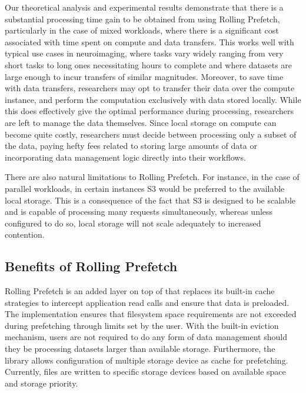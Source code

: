Our theoretical analysis and experimental results demonstrate that there is a substantial processing time gain to be
obtained from using Rolling Prefetch, particularly in the case of mixed workloads, where there is a significant
cost associated with time spent on compute and data transfers. This works well with typical use cases in neuroimaging,
where tasks vary widely ranging from very short tasks to long ones necessitating hours to complete and where datasets
are large enough to incur transfers of similar magnitudes. Moreover, to save time with data transfers, researchers
may opt to transfer their data over the compute instance, and perform the computation exclusively with
data stored locally. While this does effectively give the optimal performance during processing, researchers are left to manage
the data themselves. Since local storage on compute can become quite costly, researchers must decide between
processing only a subset of the data, paying hefty fees related to storing large amounts of data or 
incorporating data management logic directly into their workflows. 

There are also natural limitations to
Rolling Prefetch. For instance, in the case of parallel workloads, in certain instances S3 would be
preferred to the available local storage. This is a consequence of the fact that S3 is designed to be scalable
and is capable of processing many requests simultaneously, whereas unless configured to do so, local storage
will not scale adequately to increased contention.


\subsection{Benefits of Rolling Prefetch}

Rolling Prefetch is an added layer on top of \sfs that replaces its built-in cache strategies to intercept
application read calls and ensure that data is preloaded. The implementation ensures that filesystem space requirements are not exceeded during prefetching through limits set by the user. 
With the built-in eviction mechanism, users are not required to do any form of data management should they be processing datasets larger than available storage. Furthermore, the library allows configuration of multiple storage device as cache for prefetching. Currently,
files are written to specific storage devices based on available space and storage priority.

